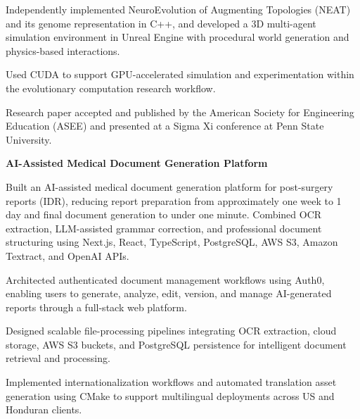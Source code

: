 \documentclass{../../../Styles/MS-Style}
\begin{document}
\begin{Form}
\begin{listBlock}
		\generalItem
		Independently implemented NeuroEvolution of Augmenting Topologies (NEAT) and its
		genome representation in C++, and developed a 3D multi-agent simulation environment
		in Unreal Engine with procedural world generation and physics-based interactions.

		\generalItem
		Used CUDA to support GPU-accelerated simulation and experimentation
		within the evolutionary computation research workflow.

		\generalItem
		Research paper accepted and published by the American Society for Engineering Education
		(ASEE) and presented at a Sigma Xi conference at Penn State University.\cite{AITagResearchPublication}
		\cite{AITagSigmaXIPresentation}

	\end{listBlock}




	\textbf{AI-Assisted Medical Document Generation Platform}

	\begin{listBlock}

		\generalItem
		Built an AI-assisted medical document generation platform for post-surgery reports (IDR),
		reducing report preparation from approximately one week to 1 day and final document
		generation to under one minute. Combined OCR extraction, LLM-assisted grammar correction,
		and professional document structuring using Next.js, React, TypeScript, PostgreSQL,
		AWS S3, Amazon Textract, and OpenAI APIs.

		\generalItem
		Architected authenticated document management workflows using Auth0, enabling users
		to generate, analyze, edit, version, and manage AI-generated reports through
		a full-stack web platform.

		\generalItem
		Designed scalable file-processing pipelines integrating OCR extraction,
		cloud storage, AWS S3 buckets, and PostgreSQL persistence for intelligent
		document retrieval and processing.

		\generalItem
		Implemented internationalization workflows and automated translation asset generation
		using CMake to support multilingual deployments across US and Honduran clients.

	\end{listBlock}


\end{Form}
\end{document}
